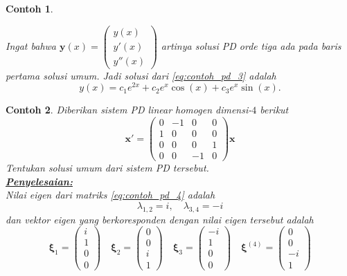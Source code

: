 \documentclass[a4paper]{article}
\theoremstyle{definisi}
\newtheorem{contoh}{Contoh}[subsection]
\newcommand{\bfxi}{\boldsymbol{\xi}}
\newcommand{\solusi}{\textbf{\underline{Penyelesaian:}}\\}
\numberwithin{equation}{section}
\begin{document}
\begin{contoh}
\begin{enumerate}[label=Langkah \arabic*: ,leftmargin=*]
    \end{enumerate}
    Ingat bahwa $\mathbf{y}(x)=\begin{pmatrix}y(x)\\y'(x)\\y''(x)\end{pmatrix}$ artinya solusi PD orde tiga ada pada baris pertama solusi umum. Jadi solusi dari \eqref{eq:contoh_pd_3} adalah
    \[y(x) = c_1e^{2x} + c_2e^x\cos(x) + c_3e^x\sin(x).\] 
  \end{contoh}

  \begin{contoh}
    Diberikan sistem PD linear homogen dimensi-$4$ berikut
    \begin{equation}\label{eq:contoh_pd_4}
      \mathbf{x'}=\begin{pmatrix}
        0 & -1 & 0 & 0\\
        1 & 0 & 0 & 0\\
        0 & 0 & 0 & 1\\
        0 & 0 & -1 & 0 
      \end{pmatrix}\mathbf{x}
    \end{equation}
    Tentukan solusi umum dari sistem PD tersebut.\\
    \solusi
    Nilai eigen dari matriks \eqref{eq:contoh_pd_4} adalah
    \[\lambda_{1,2} = i, \quad \lambda_{3,4} = -i\]
    dan vektor eigen yang berkoresponden dengan nilai eigen tersebut adalah
    \[\bfxi_1 = \begin{pmatrix}i\\1\\0\\0\end{pmatrix} \quad \bfxi_2 = \begin{pmatrix}0\\0\\i\\1\end{pmatrix} \quad \bfxi_3 = \begin{pmatrix}-i\\1\\0\\0\end{pmatrix} \quad \bfxi^{(4)} = \begin{pmatrix}0\\0\\-i\\1\end{pmatrix}\]
    \begin{enumerate}[label=Langkah \arabic*: ,leftmargin=*]

\end{enumerate}
\end{contoh}
\end{document}
